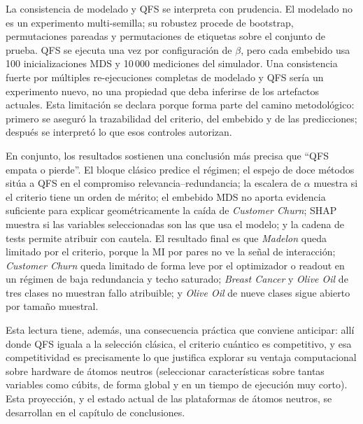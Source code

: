 La consistencia de modelado y QFS se interpreta con prudencia. El
modelado no es un experimento multi-semilla; su robustez procede de
bootstrap, permutaciones pareadas y permutaciones de etiquetas sobre el
conjunto de prueba. QFS se ejecuta una vez por configuración de
$\beta$, pero cada embebido usa 100 inicializaciones MDS y 10\,000
mediciones del simulador. Una consistencia fuerte por múltiples
re-ejecuciones completas de modelado y QFS sería un experimento nuevo,
no una propiedad que deba inferirse de los artefactos actuales. Esta
limitación se declara porque forma parte del camino metodológico:
primero se aseguró la trazabilidad del criterio, del embebido y de las
predicciones; después se interpretó lo que esos controles autorizan.

En conjunto, los resultados sostienen una conclusión más precisa que
``QFS empata o pierde''. El bloque clásico predice el régimen; el espejo
de doce métodos sitúa a QFS en el compromiso relevancia--redundancia; la
escalera de $\alpha$ muestra si el criterio tiene un orden de mérito; el
embebido MDS no aporta evidencia suficiente para explicar geométricamente
la caída de \textit{Customer Churn}; SHAP muestra si las variables seleccionadas son las que usa el
modelo; y la cadena de tests permite atribuir con cautela. El resultado
final es que \textit{Madelon} queda limitado por el criterio, porque la
MI por pares no ve la señal de interacción; \textit{Customer Churn}
queda limitado de forma leve por el optimizador o readout en un régimen
de baja redundancia y techo saturado; \textit{Breast Cancer} y
\textit{Olive Oil} de tres clases no muestran fallo atribuible; y
\textit{Olive Oil} de nueve clases sigue abierto por tamaño muestral.

Esta lectura tiene, además, una consecuencia práctica que conviene
anticipar: allí donde QFS iguala a la selección clásica, el criterio
cuántico es competitivo, y esa competitividad es precisamente lo que
justifica explorar su ventaja computacional sobre hardware de átomos
neutros (seleccionar características sobre tantas variables como cúbits,
de forma global y en un tiempo de ejecución muy corto). Esta
proyección, y el estado actual de las plataformas de átomos neutros, se
desarrollan en el capítulo de conclusiones.

